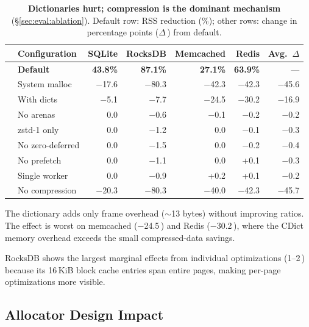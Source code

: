 \begin{table}[h]
\caption{\textbf{Dictionaries hurt; compression is the dominant
  mechanism} (\S\ref{sec:eval:ablation}).  Default row: RSS
  reduction (\%); other rows: change in percentage points
  ($\Delta$\,\pp) from default.}
\label{tab:ablation}
\centering\small
\begin{tabular}{llrrrrr}
\toprule
 & Configuration & SQLite & RocksDB & Memcached & Redis & Avg.\ $\Delta$ \\
\midrule
    & \textbf{Default}  & \textbf{43.8\%}  & \textbf{87.1\%}  & \textbf{27.1\%} & \textbf{63.9\%} & --- \\
    & System malloc      & $-$17.6 & $-$80.3 & $-$42.3 & $-$42.3 & $-$45.6 \\
\midrule
    & With dicts         & $-$5.1  & $-$7.7  & $-$24.5 & $-$30.2 & $-$16.9 \\
    & No arenas          & 0.0     & $-$0.6  & $-$0.1  & $-$0.2  & $-$0.2 \\
    & zstd-1 only        & 0.0     & $-$1.2  & 0.0     & $-$0.1  & $-$0.3 \\
    & No zero-deferred   & 0.0     & $-$1.5  & 0.0     & $-$0.2  & $-$0.4 \\
    & No prefetch        & 0.0     & $-$1.1  & 0.0     & +0.1    & $-$0.3 \\
    & Single worker      & 0.0     & $-$0.9  & +0.2    & +0.1    & $-$0.2 \\
    & No compression     & $-$20.3 & $-$80.3 & $-$40.0 & $-$42.3 & $-$45.7 \\
\bottomrule
\end{tabular}
\end{table}

The dictionary adds only frame overhead ($\sim$13 bytes) without
improving ratios.  The effect is worst on memcached ($-$24.5\,\pp) and
Redis ($-$30.2\,\pp), where the CDict memory overhead exceeds the
small compressed-data savings.

RocksDB shows the largest marginal effects from individual
optimizations (1--2\,\pp) because its 16\,KiB block cache entries span
entire pages, making per-page optimizations more visible.

\subsection{Allocator Design Impact}

